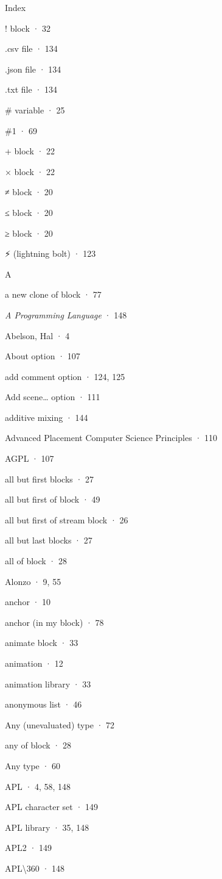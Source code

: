 Index

! block · 32

.csv file · 134

.json file · 134

.txt file · 134

\# variable · 25

\#1 · 69

+ block · 22

× block · 22

≠ block · 20

≤ block · 20

≥ block · 20

⚡ (lightning bolt) · 123

A

a new clone of block · 77

\emph{A Programming Language} · 148

Abelson, Hal · 4

About option · 107

add comment option · 124, 125

Add scene\ldots{} option · 111

additive mixing · 144

Advanced Placement Computer Science Principles · 110

AGPL · 107

all but first blocks · 27

all but first of block · 49

all but first of stream block · 26

all but last blocks · 27

all of block · 28

Alonzo · 9, 55

anchor · 10

anchor (in my block) · 78

animate block · 33

animation · 12

animation library · 33

anonymous list · 46

Any (unevaluated) type · 72

any of block · 28

Any type · 60

APL · 4, 58, 148

APL character set · 149

APL library · 35, 148

APL2 · 149

APL\textbackslash360 · 148


